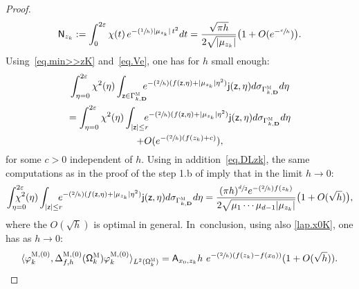 \documentclass[10pt]{amsart}
\newcommand{\Psfrac}[2]{(\sfrac{#1}{#2})}
\newcommand{\mbf}[1]{\mathbf{#1}}
\let\ve\varepsilon
\theoremstyle{plain}
\theoremstyle{definition}
\begin{document}
\begin{proof}
\begin{align}
\mathsf N_{z_k}:=\int_0^{2\ve}\chi(t)\, e^{-\Psfrac 1h\vert \mu_{z_k}\vert \, t^2} dt=\frac{\sqrt{\pi h} }{2\sqrt{\vert \mu_{z_k}\vert}} \bigl(1+O(e^{-\sfrac ch})\bigr).
\end{align}
Using~\eqref{eq.min>>zK} and~\eqref{eq.Ve}, one has for $h$ small enough:\vspace*{-3pt}
\begin{multline*}
\int_{\eta=0}^{2\ve} \chi^2(\eta) \int_{\mathsf z \in \Gamma_{k,\mbf
D}^{\textsc{M}} } \!\! \!\! e^{-\Psfrac 2h
(f(\mathsf z,\eta) +\vert \mu_{z_k}\vert \eta^2)}
\mathsf j(\mathsf z,\eta)d\sigma
_{\Gamma^{\textsc{M}}_{k,\mbf D}} d\eta\\
= \int_{\eta=0}^{2\ve} \chi^2(\eta) \int_{|\mathsf z |\le r } \!\! \!\! e^{-\Psfrac 2h (f(\mathsf z,\eta) +\vert \mu_{z_k}\vert \eta^2)} \mathsf j(\mathsf z,\eta) d\sigma _{\Gamma^{\textsc{M}}_{k,\mbf D}} d\eta \\
+O(e^{-\Psfrac 2h (f(z_k)+c)}),
\end{multline*}
for some $c>0$ independent of $h$.
Using in addition~\eqref{eq.DLzk}, the same computations as in the proof of the step 1.b of \cite[Prop.\,24]{DoNe2} imply that in the limit $h\to 0$:\vspace*{-3pt}
\[
\int_{\eta=0}^{2\ve} \!\!\! \!\!\! \!\!\chi^2(\eta) \int_{|\mathsf z |\le r } \!\! \!\! e^{-\Psfrac 2h (f(\mathsf z,\eta) +\vert \mu_{z_k}\vert \eta^2)} \mathsf j(\mathsf z,\eta) d\sigma _{\Gamma^{\textsc{M}}_{k,\mbf D}} d\eta =\frac{ (\pi h)^{\sfrac{d}{2} } e^{-\Psfrac 2h f(z_k)}}{2\sqrt{\mu_1 \cdots \mu_{d-1} \vert \mu_{z_k}\vert}}
\bigl(1+ O (\sqrt h) \bigr),
\]
where the $O (\sqrt h)$ is optimal in general. In~conclusion, using also \eqref{lap.x0K}, one has as $h\to 0$:
\begin{equation}\label{eq.Ax0ps}
\langle \varphi^{\textsc{M},(0)}_k,\Delta_{f,h}^{\textsc{M}, (0)}(\mathsf \Omega_k^{\textsc{M}}) \varphi^{\textsc{M},(0)}_k \rangle_{L^2(\mathsf \Omega_k^{\textsc{M}})}= \mathsf A_{x_0,z_k}h \ e^{-\Psfrac 2h (f(z_k)-f(x_0))} (1+O(\sqrt h)).
\end{equation}


\end{proof}
\end{document}
